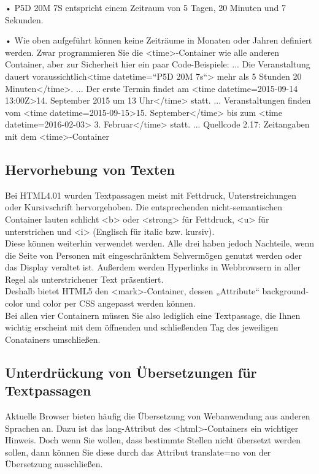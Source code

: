 •	P5D 20M 7S entspricht einem Zeitraum von 5 Tagen, 20 Minuten und 7 Sekunden.

•	Wie oben aufgeführt können keine Zeiträume in Monaten oder Jahren definiert werden.
Zwar programmieren Sie die <time>-Container wie alle anderen Container, aber zur Sicherheit hier ein paar Code-Beispiele:
...
Die Veranstaltung dauert voraussichtlich<time datetime=“P5D 20M 7s“> mehr als 5 Stunden 20 Minuten</time>.
...
Der erste Termin findet am <time datetime=2015-09-14 13:00Z>14. September 2015 um 13 Uhr</time> statt.
...
Veranstaltungen finden vom <time datetime=2015-09-15>15. September</time> bis zum <time datetime=2016-02-03> 3. Februar</time> statt.
...
Quellcode 2.17: Zeitangaben mit dem <time>-Container

\subsection{Hervorhebung von Texten}

Bei HTML4.01 wurden Textpassagen meist mit Fettdruck, Unterstreichungen oder Kursivschrift hervorgehoben. Die entsprechenden nicht-semantischen Container lauten schlicht <b> oder <strong> für Fettdruck, <u> für unterstrichen und <i> (Englisch für italic bzw. kursiv). \\

Diese können weiterhin verwendet werden. Alle drei haben jedoch Nachteile, wenn die Seite von Personen mit eingeschränktem Sehvermögen genutzt werden oder das Display veraltet ist. Außerdem werden Hyperlinks in Webbrowsern in aller Regel als unterstrichener Text präsentiert.\\

Deshalb bietet HTML5 den <mark>-Container, dessen „Attribute“ background-color und color per CSS angepasst werden können. \\

Bei allen vier Containern müssen Sie also lediglich eine Textpassage, die Ihnen wichtig erscheint mit dem öffnenden und schließenden Tag des jeweiligen Conatainers umschließen.

\subsection{Unterdrückung von Übersetzungen für Textpassagen}

Aktuelle Browser bieten häufig die Übersetzung von Webanwendung aus anderen Sprachen an. Dazu ist das lang-Attribut des <html>-Containers ein wichtiger Hinweis. Doch wenn Sie wollen, dass bestimmte Stellen nicht übersetzt werden sollen, dann können Sie diese durch das Attribut translate=no von der Übersetzung ausschließen.\\

